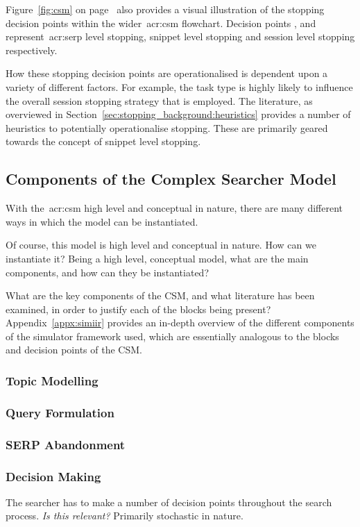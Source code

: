 Figure~\ref{fig:csm} on page~\pageref{fig:csm} also provides a visual illustration of the stopping decision points within the wider~\gls{acr:csm} flowchart. Decision points ,  and  represent~\gls{acr:serp} level stopping, snippet level stopping and session level stopping respectively.

How these stopping decision points are operationalised is dependent upon a variety of different factors. For example, the task type is highly likely to influence the overall session stopping strategy that is employed. The literature, as overviewed in Section~\ref{sec:stopping_background:heuristics} provides a number of heuristics to potentially operationalise stopping. These are primarily geared towards the concept of snippet level stopping.

\subsection{Components of the Complex Searcher Model}
With the~\gls{acr:csm} high level and conceptual in nature, there are many different ways in which the model can be instantiated.


Of course, this model is high level and conceptual in nature. How can we instantiate it?
Being a high level, conceptual model, what are the main components, and how can they be instantiated?

What are the key components of the CSM, and what literature has been examined, in order to justify each of the blocks being present? Appendix~\ref{appx:simiir} provides an in-depth overview of the different components of the simulator framework used, which are essentially analogous to the blocks and decision points of the CSM.

\subsubsection{Topic Modelling}

\subsubsection{Query Formulation}

\subsubsection{SERP Abandonment}

\subsubsection{Decision Making}
The searcher has to make a number of decision points throughout the search process.
\emph{Is this relevant?}
Primarily stochastic in nature.

